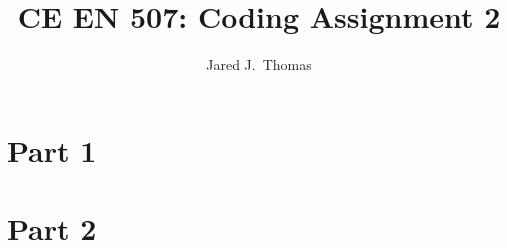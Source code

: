 \documentclass{article}
\title{CE EN 507: Coding Assignment 2}
\author{ Jared J.~Thomas}
\begin{document}
\maketitle

\section{Part 1}

\subsection{}

\subsection{}

\section{Part 2}

\subsection{}

\subsection{}
\end{document}
